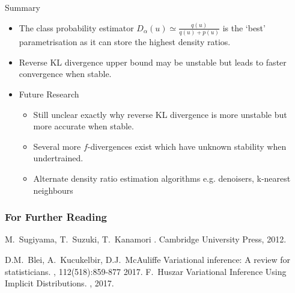 \documentclass[handout]{beamer}
\begin{document}
\begin{frame}{Summary}
  \begin{itemize}
  \item
    The class probability estimator $D_\alpha(u)\simeq\frac{q(u)}{q(u)+p(u)}$ is the `best' parametrisation as it can store the \alert{highest density ratios}.
  \item
    Reverse KL divergence upper bound may be \alert{unstable} but leads to \alert{faster convergence} when stable.
  \end{itemize}
  
  \begin{itemize}
  \item
    Future Research
    \begin{itemize}
    \item
      Still unclear exactly why reverse KL divergence is more unstable but more accurate when stable.
    \item
      Several more $f$-divergences exist which have unknown stability when undertrained.
    \item Alternate density ratio estimation algorithms e.g. denoisers, k-nearest neighbours
    \end{itemize}
  \end{itemize}
\end{frame}


%
\begin{frame}[allowframebreaks]
  \frametitle<presentation>{For Further Reading}
    
  \begin{thebibliography}{10}
    
  \beamertemplatebookbibitems

    M.~Sugiyama, T.~Suzuki, T.~Kanamori
    .
    \newblock Cambridge University Press, 2012.
 
    
  \beamertemplatearticlebibitems
    D.M.~Blei, A.~Kucukelbir, D.J.~McAuliffe
    \newblock Variational inference: A review for statisticians.
    , 112(518):859-877
    2017.
    F.~Huszar
    \newblock Variational Inference Using Implicit Distributions.
    ,
    2017.
  \end{thebibliography}
\end{frame}
\end{document}
